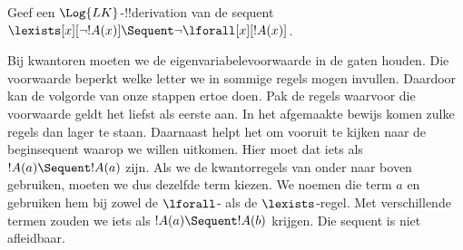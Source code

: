 \documentclass[../../../include/open-logic-section]{subfiles}
\begin{document}


\begin{ex}
Geef een $\Log{LK}$-!!{derivation} van de sequent
$\lexists[x][\lnot !A(x)] \Sequent \lnot \lforall[x][!A(x)]$.

Bij kwantoren moeten we de eigenvariabelevoorwaarde in de gaten
houden. Die voorwaarde beperkt welke letter we in sommige regels mogen
invullen. Daardoor kan de volgorde van onze stappen ertoe doen. Pak de
regels waarvoor die voorwaarde geldt het liefst als eerste aan. In het
afgemaakte bewijs komen zulke regels dan lager te staan.
Daarnaast helpt het om vooruit te kijken naar de beginsequent waarop
we willen uitkomen. Hier moet dat iets als $!A(a) \Sequent !A(a)$ zijn.
Als we de kwantorregels van onder naar boven gebruiken, moeten we dus
dezelfde term kiezen. We noemen die term $a$ en gebruiken hem bij zowel
de $\lforall$- als de $\lexists$-regel. Met verschillende termen zouden
we iets als $!A(a) \Sequent !A(b)$ krijgen. Die sequent is niet
afleidbaar.


\end{ex}
\end{document}
